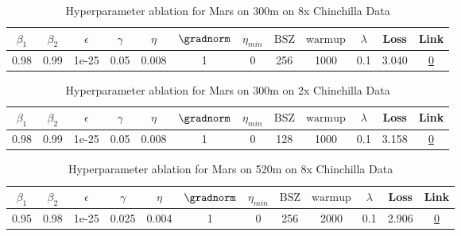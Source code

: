 \begin{table}[H]
\centering
\caption{Hyperparameter ablation for Mars on 300m on 8x Chinchilla Data}
\label{tab:ablation_mars_300m_8}
\begin{tabular}{cccccccccccc}
\toprule
$\beta_1$ & $\beta_2$ & $\epsilon$ & $\gamma$ & $\eta$ & $\gradnorm$ & $\eta_{min}$ & $\mathrm{BSZ}$ & $\mathrm{warmup}$ & $\lambda$ & Loss & Link \\
\midrule
0.98 & 0.99 & 1e-25 & 0.05 & 0.008 & 1 & 0 & 256 & 1000 & 0.1 & 3.040 & \href{https://wandb.ai/stanford-mercury/optimizer-scaling/runs/sweep-300m-48B-mars3a0394lr0.008-wd0.1-minlr0-warmup1000-b10.98--b18370}{0} \\
\midrule
\bottomrule
\end{tabular}
\end{table}

\begin{table}[H]
\centering
\caption{Hyperparameter ablation for Mars on 300m on 2x Chinchilla Data}
\label{tab:ablation_mars_300m_2}
\begin{tabular}{cccccccccccc}
\toprule
$\beta_1$ & $\beta_2$ & $\epsilon$ & $\gamma$ & $\eta$ & $\gradnorm$ & $\eta_{min}$ & $\mathrm{BSZ}$ & $\mathrm{warmup}$ & $\lambda$ & Loss & Link \\
\midrule
0.98 & 0.99 & 1e-25 & 0.05 & 0.008 & 1 & 0 & 128 & 1000 & 0.1 & 3.158 & \href{https://wandb.ai/stanford-mercury/optimizer-scaling/runs/sweep-300m-12B-marskbb066blr0.008-wd0.1-minlr0-warmup1000-b10.98-f75ea4}{0} \\
\midrule
\bottomrule
\end{tabular}
\end{table}

\begin{table}[H]
\centering
\caption{Hyperparameter ablation for Mars on 520m on 8x Chinchilla Data}
\label{tab:ablation_mars_520m_8}
\begin{tabular}{cccccccccccc}
\toprule
$\beta_1$ & $\beta_2$ & $\epsilon$ & $\gamma$ & $\eta$ & $\gradnorm$ & $\eta_{min}$ & $\mathrm{BSZ}$ & $\mathrm{warmup}$ & $\lambda$ & Loss & Link \\
\midrule
0.95 & 0.98 & 1e-25 & 0.025 & 0.004 & 1 & 0 & 256 & 2000 & 0.1 & 2.906 & \href{https://wandb.ai/stanford-mercury/optimizer-scaling/runs/sweep-520m-85B-mars995e4flr0.004-wd0.1-minlr0-warmup2000-b10.95--18e62c}{0} \\
\midrule
\bottomrule
\end{tabular}
\end{table}

